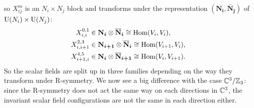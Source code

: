         so $X^m_{ij}$ is an $N_i\times N_j$ block and transforms under the representation $(\boldsymbol{\textbf{N}_i},\boldsymbol{\bar{\textbf{N}}_j})$ of $\text{U}(N_i)\times\text{U}(N_j)$:
        \begin{align}
            X^{0,1}_{i,i} &\in \boldsymbol{\textbf{N}_i}\otimes\boldsymbol{\overline{\textbf{N}}_i} \cong \text{Hom}(V_i,V_i),\\
            X^{2,3}_{i,i+1} &\in \boldsymbol{\textbf{N}_{i+1}}\otimes\boldsymbol{\overline{\textbf{N}}_i} \cong \text{Hom}(V_{i+1},V_i),\\
            X^{4,5}_{i+1,i} &\in \boldsymbol{\textbf{N}_i}\otimes\boldsymbol{\overline{\textbf{N}}_{i+1}} \cong \text{Hom}(V_i,V_{i+1}).
        \end{align}
        So the scalar fields are split up in three families depending on the way they transform under R-symmetry. We now see a big difference with the case $\mathbb{C}^3/\mathbb{Z}_3$: since the R-symmetry does not act the same way on each directions in $\mathbb{C}^3$, the invariant scalar field configurations are not the same in each direction either.

